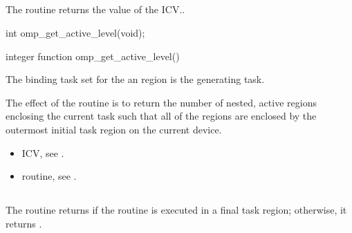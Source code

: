 \subsection{}
\label{subsec:omp_get_active_level}
\summary
The  routine returns the value of the  ICV..

\format
\begin{ccppspecific}
\begin{ompcFunction}
int omp_get_active_level(void);
\end{ompcFunction}
\end{ccppspecific}

\pagebreak
\begin{fortranspecific}
\begin{ompfFunction}
integer function omp_get_active_level()
\end{ompfFunction}
\end{fortranspecific}

\binding
The binding task set for the an  region is the generating 
task. 

\effect
The effect of the  routine is to return the number of nested, 
active  regions enclosing the current task such that all of the  
regions are enclosed by the outermost initial task region on the current device. 

\crossreferences
\begin{itemize}
\item {} ICV, see 
.

\item {} routine, see 
. 
\end{itemize}











\subsection{}
\label{subsec:omp_in_final}
\summary
The  routine returns  if the routine is executed in a final task 
region; otherwise, it returns .

